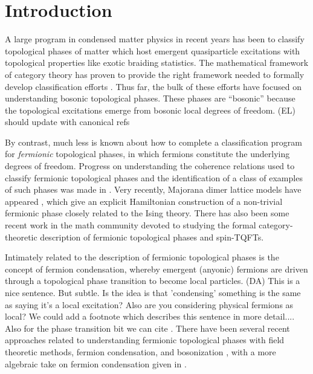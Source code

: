 \documentclass[12pt,a4paper]{article}
\newcommand{\dave}[1]{{\color{ao(english)}\footnotesize{(DA) #1}}}
\newcommand{\ethan}[1]{{\color{amethyst}\footnotesize{(EL) #1}}}
\begin{document}
\section{Introduction}

A large program in condensed matter physics in recent years has been to classify 
topological phases of matter which host emergent quasiparticle excitations 
with topological properties like exotic braiding statistics. 
The mathematical framework of category theory has proven to provide the right 
framework needed to formally develop classification efforts \cite{kitaev2006}. 
Thus far, the bulk of these efforts have focused on understanding bosonic topological phases.
These phases are ``bosonic'' because the topological excitations emerge from bosonic 
local degrees of freedom. \ethan{should update with canonical refs}

By contrast, much less is known about how to complete a classification program for {\it fermionic} topological phases, in which fermions constitute 
the underlying degrees of freedom. 
Progress on understanding the coherence relations used to classify fermionic topological phases and the identification of a class of examples of such phases was made in \cite{gu2015,gu2014,Lan2016b}. 
Very recently, Majorana dimer lattice models have appeared \cite{ware2016,tarantino2016}, 
which give an explicit Hamiltonian construction of a 
non-trivial
fermionic phase closely related to the Ising theory. 
There has also been some recent work in the math community \cite{usher2016,brundan2016,bruillard2017,bonderson2017} 
devoted to studying the formal category-theoretic description of fermionic topological phases and spin-TQFTs. 

Intimately related to the description of fermionic topological phases is the concept of fermion condensation, 
whereby emergent (anyonic) fermions are driven through a topological phase transition to become 
local particles. 
\dave{This is a nice sentence. But subtle. 
Is the idea is that 'condensing' something is the same as saying it's a local excitation?
Also are you considering physical fermions as local?
We could add a footnote which describes this sentence in more detail....
Also for the phase transition bit we can cite \cite{Bais2009}.}
There have been several recent approaches related to understanding 
fermionic topological phases with field theoretic methods, fermion condensation, and bosonization \cite{gaiotto2016, bhardwaj2016, bhardwaj2016b,kapustin2017,putrov2016}, 
with a more algebraic take on fermion condensation given in \cite{wan2016}. 
\end{document}
